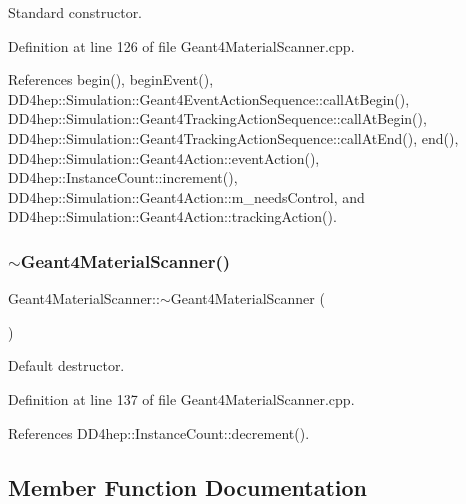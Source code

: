 Standard constructor. 



Definition at line 126 of file Geant4\+Material\+Scanner.\+cpp.



References begin(), begin\+Event(), D\+D4hep\+::\+Simulation\+::\+Geant4\+Event\+Action\+Sequence\+::call\+At\+Begin(), D\+D4hep\+::\+Simulation\+::\+Geant4\+Tracking\+Action\+Sequence\+::call\+At\+Begin(), D\+D4hep\+::\+Simulation\+::\+Geant4\+Tracking\+Action\+Sequence\+::call\+At\+End(), end(), D\+D4hep\+::\+Simulation\+::\+Geant4\+Action\+::event\+Action(), D\+D4hep\+::\+Instance\+Count\+::increment(), D\+D4hep\+::\+Simulation\+::\+Geant4\+Action\+::m\+\_\+needs\+Control, and D\+D4hep\+::\+Simulation\+::\+Geant4\+Action\+::tracking\+Action().

\hypertarget{class_d_d4hep_1_1_simulation_1_1_geant4_material_scanner_af31f21a00b4c9cab1a73aeddb1a3773b}{}\label{class_d_d4hep_1_1_simulation_1_1_geant4_material_scanner_af31f21a00b4c9cab1a73aeddb1a3773b} 
\subsubsection{\texorpdfstring{$\sim$\+Geant4\+Material\+Scanner()}{~Geant4MaterialScanner()}}
{\footnotesize\ttfamily Geant4\+Material\+Scanner\+::$\sim$\+Geant4\+Material\+Scanner (\begin{DoxyParamCaption}{ }\end{DoxyParamCaption})\hspace{0.3cm}{\ttfamily [virtual]}}



Default destructor. 



Definition at line 137 of file Geant4\+Material\+Scanner.\+cpp.



References D\+D4hep\+::\+Instance\+Count\+::decrement().



\subsection{Member Function Documentation}
\hypertarget{class_d_d4hep_1_1_simulation_1_1_geant4_material_scanner_adb6b4a72be62b6b7c440db01d147d7e1}{}\label{class_d_d4hep_1_1_simulation_1_1_geant4_material_scanner_adb6b4a72be62b6b7c440db01d147d7e1} 
